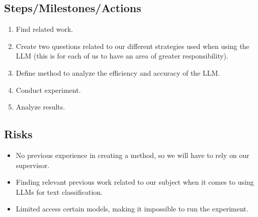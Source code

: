 \subsection{Steps/Milestones/Actions}

\begin{enumerate}
      \item Find related work.
      \item Create two questions related to our different strategies used
            when using the LLM (this is for each of us to have an area of
            greater responsibility).
      \item Define method to analyze the efficiency and accuracy of the LLM.
      \item Conduct experiment.
      \item Analyze results.
\end{enumerate}

\subsection{Risks}

\begin{itemize}
      \item No previous experience in creating a method, so we will have to rely
            on our supervisor.
      \item Finding relevant previous work related to our subject when it comes
            to using LLMs for text classification.
      \item Limited access certain models, making it impossible to run the
            experiment.
\end{itemize}
